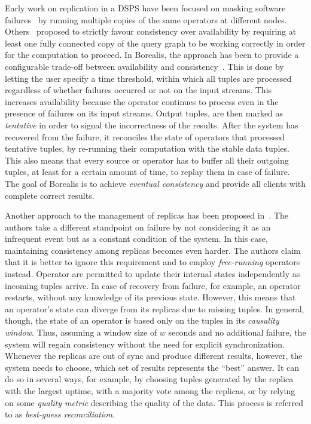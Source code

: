 Early work on replication in a DSPS have been focused on masking software
failures~\cite{borealis_ha_algos} by running multiple copies of the same operators at different nodes.
Others~\cite{ha_ft_dataflows} proposed to strictly favour consistency over availability by
requiring at least one fully connected copy of the query graph to be working correctly in order for the
computation to proceed. %
In Borealis, the approach has been to provide a configurable trade-off between availability and
consistency~\cite{borealis-fault_tolerance}.
This is done by letting the user specify a time threshold, within which all tuples are processed
regardless of whether failures occurred or not on the input streams. This increases availability because
the operator continues to process even in the presence of failures on its input streams. Output tuples,
are then marked as \textit{tentative} in order to signal the incorrectness of the results. After the
system has recovered from the failure, it reconciles the state of operators that processed
tentative tuples, by re-running their computation with the stable data tuples. This also means that every
source or operator has to buffer all their outgoing tuples, at least for a certain amount of time, to
replay them in case of failure. The goal of Borealis is to achieve \textit{eventual consistency} and
provide all clients with complete correct results.

Another approach to the management of replicas has been proposed in~\cite{dependable-is-sensing}. The authors take a
different standpoint on failure by not considering it as an infrequent event but as a constant condition
of the system. In this case, maintaining consistency among replicas becomes even harder. The
authors claim that it is better to ignore this requirement and to employ \textit{free-running} operators
instead.
Operator are permitted to update their internal states independently as incoming tuples arrive. In case
of recovery from failure, for example, an operator restarts, without any knowledge of its
previous state. However, this means that an operator's state can diverge from its replicas due to
missing tuples.
In general, though, the state of an operator is based only on the tuples in its \textit{causality
window}. Thus, assuming a window size of $w$ seconds and no additional failure, the system will regain
consistency without the need for explicit synchronization. Whenever the replicas are out of sync and
produce different results, however, the system needs to choose, which set of results represents the
``best'' answer.
It can do so in several ways, for example, by choosing tuples generated by the replica with the largest
uptime, with a majority vote among the replicas, or by relying on some \textit{quality metric}
describing the quality of the data. This process is referred to as \textit{best-guess reconciliation}.
